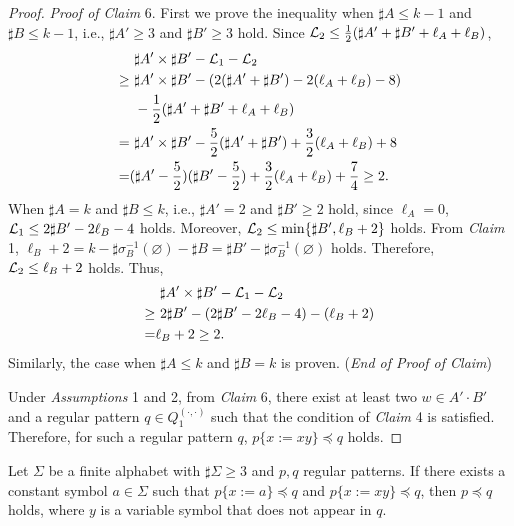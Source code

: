 \begin{proof}
\noindent
\textit{Proof of Claim} 6. 
First we prove the inequality when $\sharp A \leq k - 1$ and $\sharp B \leq k - 1$, i.e., $\sharp A' \geq 3$ and $\sharp B' \geq 3$ hold.
Since ${\cal L}_{2} \leq \frac{1}{2}(\sharp A' + \sharp B' + \ell_{A} + \ell_{B})$,
\begin{align*}
  &\ \sharp A' \times \sharp B' - {\cal L}_{1} - {\cal L}_{2}\\
\geq &\ \sharp A' \times \sharp B' - (2(\sharp A' + \sharp B') - 2(\ell_{A} + \ell_{B}) - 8)\\
  &\ - \frac{1}{2}(\sharp A' + \sharp B' + \ell_{A} + \ell_{B})\\
=    &\ \sharp A' \times \sharp B' - \frac{5}{2}(\sharp A' + \sharp B') + \frac{3}{2}(\ell_{A} + \ell_{B}) + 8\\
=    &(\sharp A' - \frac{5}{2})(\sharp B' - \frac{5}{2}) + \frac{3}{2}(\ell_{A} + \ell_{B}) + \frac{7}{4} \geq 2.
\end{align*}
When $\sharp A = k$ and $\sharp B \leq k$, i.e., $\sharp A' = 2$ and $\sharp B' \geq 2$ hold, since $\ell_{A} = 0$,
${\cal L}_{1} \leq 2\sharp B' - 2\ell_{B} -4$ holds.
Moreover, ${\cal L}_{2} \leq \min\{\sharp B', \ell_{B} + 2\}$ holds.
From \textit{Claim} 1, $\ell_B + 2 = k - \sharp\sigma^{-1}_{B}(\varnothing) - \sharp B = \sharp B' - \sharp\sigma^{-1}_{B}(\varnothing)$ holds. Therefore, ${\cal L}_{2} \leq \ell_{B} + 2$ holds.
Thus,
\begin{align*}
  &\ \sharp A' \times \sharp B' - {\cal L}_{1} - {\cal L}_{2}\\
\geq &\ 2\sharp B' - (2\sharp B' - 2\ell_{B} -4) - (\ell_{B} + 2)\\
= & \ell_B + 2 \geq 2.
\end{align*}
Similarly, the case when $\sharp A \leq k$ and $\sharp B = k$ is proven.
(\textit{End of Proof of Claim})

\smallskip

Under \textit{Assumptions} 1 and 2, from \textit{Claim} 6, there exist at least two $w\in A'\cdot B'$ and a regular pattern $q \in Q_{1}^{(\cdot,\cdot)}$ such that the condition of \textit{Claim} 4 is satisfied. 
Therefore, for such a regular pattern $q$, $p \{x := xy\} \preceq q$ holds.
\end{proof}

\begin{lem}\label{補題15}
Let $\Sigma$ be a finite alphabet with $\sharp \Sigma \ge 3$ and $p,q$ regular patterns.
If there exists a constant symbol $a \in \Sigma$ such that $p \{ x := a \} \preceq q$ and $p \{ x := xy \} \preceq q$, then $p \preceq q$ holds, where $y$ is a variable symbol that does not appear in $q$.
\end{lem}

